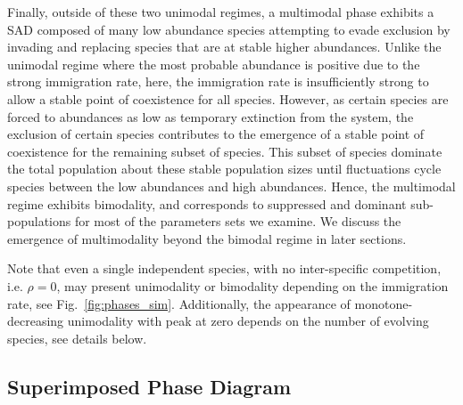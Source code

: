 \documentclass[%
 amsmath,amssymb,
reprint,%
linenumbers]{revtex4-2}
\begin{document}
Finally, outside of these two unimodal regimes, a multimodal phase exhibits a SAD composed of many low abundance species attempting to evade exclusion by invading and replacing species that are at stable higher abundances.
Unlike the unimodal regime where the most probable abundance is positive due to the strong immigration rate, %
here, the immigration rate is insufficiently strong to allow a stable point of coexistence for all species.
However, as certain species are forced to abundances as low as temporary extinction from the system, the exclusion of certain species contributes to the emergence of a stable point of coexistence for the remaining subset of species.
This subset of species dominate the total population about these stable population sizes until fluctuations cycle species between the low abundances and high abundances. Hence, the multimodal regime exhibits bimodality, and corresponds to suppressed and dominant sub-populations for most of the parameters sets we examine. 
We discuss the emergence of multimodality beyond the bimodal regime in later sections.   

Note that even a single independent species, with no inter-specific competition, i.e. $\rho=0$, may present unimodality or bimodality depending on the immigration rate, see Fig.~\ref{fig:phases_sim}. 
Additionally, the appearance of monotone-decreasing unimodality with peak at zero depends on the number of evolving species, see details below. 


\subsection{Superimposed Phase Diagram}
\end{document}

